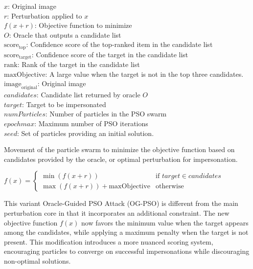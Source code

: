$x$: Original image \\
$r$: Perturbation applied to $x$ \\
$f(x + r)$: Objective function to minimize \\
$O$: Oracle that outputs a candidate list \\
$\text{score}_{\text{top}}$: Confidence score of the top-ranked item in the candidate list \\
$\text{score}_{\text{target}}$: Confidence score of the target in the candidate list \\
$\text{rank}$: Rank of the target in the candidate list \\
$\text{maxObjective}$: A large value when the target is not in the top three candidates. \\
$\text{image}_{\text{original}}$: Original image \\
$candidates$: Candidate list returned by oracle $O$ \\
$target$: Target to be impersonated \\
$numParticles$: Number of particles in the PSO swarm \\
$epochmax$: Maximum number of PSO iterations \\
$seed$: Set of particles providing an initial solution.

Movement of the particle swarm to minimize the objective function based on candidates provided by the oracle, or optimal perturbation for impersonation.


$f(x) = 
\begin{cases}
\min(f(x + r)) & \text{if } target \in candidates \\
\max(f(x + r)) + \text{maxObjective} & \text{otherwise}
\end{cases}$

This variant Oracle-Guided PSO Attack (OG-PSO) is different from the main perturbation core in that it incorporates an additional constraint. The new objective function $f(x)$ now favors the minimum value when the target appears among the candidates, while applying a maximum penalty when the target is not present. This modification introduces a more nuanced scoring system, encouraging particles to converge on successful impersonations while discouraging non-optimal solutions.